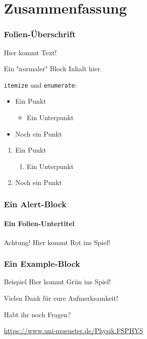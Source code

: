 \documentclass[german, ngerman]{beamer}
\begin{document}
\section{Zusammenfassung}

\begin{frame}
	\frametitle{Folien-Überschrift}

	Hier kommt Text!

	\begin{block}{Ein "normaler" Block}
		Inhalt hier.
	\end{block}

	\texttt{itemize} und \texttt{enumerate}:
	\begin{itemize}
		\item Ein Punkt
		\begin{itemize}
			\item Ein Unterpunkt
		\end{itemize}
		\item Noch ein Punkt
	\end{itemize}
	\begin{enumerate}
		\item Ein Punkt
		\begin{enumerate}
			\item Ein Unterpunkt
		\end{enumerate}
		\item Noch ein Punkt
	\end{enumerate}
\end{frame}

\begin{frame}
	\frametitle{Ein Alert-Block}
	\framesubtitle{Ein Folien-Untertitel}

	\begin{alertblock}{Achtung!}
		Hier kommt Rot ins Spiel!
	\end{alertblock}
\end{frame}

\begin{frame}
	\frametitle{Ein Example-Block}

	\begin{exampleblock}{Beispiel}
		Hier kommt Grün ins Spiel!
	\end{exampleblock}
\end{frame}

\begin{frame}
	\begin{block}{}
		\centering
		Vielen Dank für eure Aufmerksamkeit!
	\end{block}

	\begin{block}{}
		\centering
		Habt ihr noch Fragen?
	\end{block}

	\begin{center}

		\medskip
		\url{https://www.uni-muenster.de/Physik.FSPHYS}
	\end{center}
\end{frame}
\end{document}
